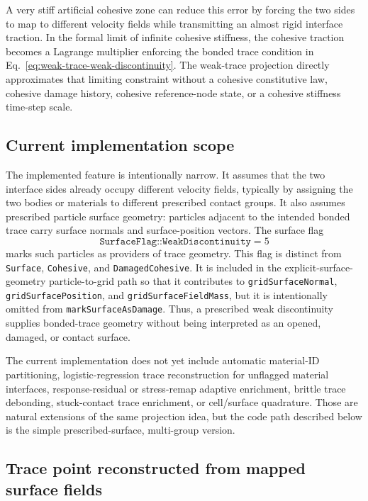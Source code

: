 A very stiff artificial cohesive zone can reduce this error by forcing the two sides to map to different velocity fields while transmitting an almost rigid interface traction.  In the formal limit of infinite cohesive stiffness, the cohesive traction becomes a Lagrange multiplier enforcing the bonded trace condition in Eq.~\eqref{eq:weak-trace-weak-discontinuity}.  The weak-trace projection directly approximates that limiting constraint without a cohesive constitutive law, cohesive damage history, cohesive reference-node state, or a cohesive stiffness time-step scale.

\subsection{Current implementation scope}

The implemented feature is intentionally narrow.  It assumes that the two interface sides already occupy different velocity fields, typically by assigning the two bodies or materials to different prescribed contact groups.  It also assumes prescribed particle surface geometry: particles adjacent to the intended bonded trace carry surface normals and surface-position vectors.  The surface flag
\begin{equation}
  \texttt{SurfaceFlag::WeakDiscontinuity}=5
\end{equation}
marks such particles as providers of trace geometry.  This flag is distinct from \texttt{Surface}, \texttt{Cohesive}, and \texttt{DamagedCohesive}.  It is included in the explicit-surface-geometry particle-to-grid path so that it contributes to \texttt{gridSurfaceNormal}, \texttt{gridSurfacePosition}, and \texttt{gridSurfaceFieldMass}, but it is intentionally omitted from \texttt{markSurfaceAsDamage}.  Thus, a prescribed weak discontinuity supplies bonded-trace geometry without being interpreted as an opened, damaged, or contact surface.

The current implementation does not yet include automatic material-ID partitioning, logistic-regression trace reconstruction for unflagged material interfaces, response-residual or stress-remap adaptive enrichment, brittle trace debonding, stuck-contact trace enrichment, or cell/surface quadrature.  Those are natural extensions of the same projection idea, but the code path described below is the simple prescribed-surface, multi-group version.

\subsection{Trace point reconstructed from mapped surface fields}

